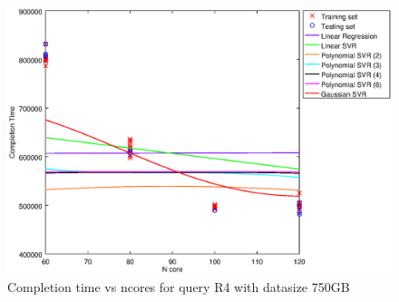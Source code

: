 
\begin {figure}[hbtp]
\centering
\includegraphics[width=\textwidth]{output/R4_750_LINEAR_NCORE/plot_R4_750.eps}
\caption{Completion time vs ncores for query R4 with datasize 750GB}
\label{fig:coreonly_linear_R4_750}
\end {figure}
